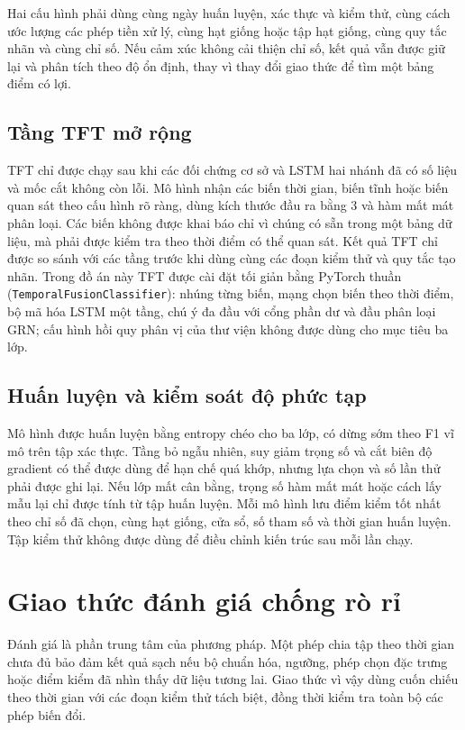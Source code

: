 Hai cấu hình phải dùng cùng ngày huấn luyện, xác thực và kiểm thử, cùng cách ước
lượng các phép tiền xử lý, cùng hạt giống hoặc tập hạt giống, cùng quy tắc nhãn và
cùng chỉ số. Nếu cảm xúc không cải thiện chỉ số, kết quả vẫn được giữ lại và phân
tích theo độ ổn định, thay vì thay đổi giao thức để tìm một bảng điểm có lợi.

\subsection{Tầng TFT mở rộng}

TFT chỉ được chạy sau khi các đối chứng cơ sở và LSTM hai nhánh đã có số liệu và mốc
cắt không còn lỗi. Mô hình nhận các biến thời gian, biến tĩnh hoặc biến quan sát theo
cấu hình rõ ràng, dùng kích thước đầu ra bằng 3 và hàm mất mát phân loại. Các biến
không được khai báo chỉ vì chúng có sẵn trong một bảng dữ liệu, mà phải được kiểm tra
theo thời điểm có thể quan sát. Kết quả TFT chỉ được so sánh với các tầng trước khi
dùng cùng các đoạn kiểm thử và quy tắc tạo nhãn. Trong đồ án này TFT được cài đặt
tối giản bằng PyTorch thuần (\texttt{TemporalFusionClassifier}): nhúng từng biến,
mạng chọn biến theo thời điểm, bộ mã hóa LSTM một tầng, chú ý đa đầu với cổng phần dư
và đầu phân loại GRN; cấu hình hồi quy phân vị của thư viện không được dùng cho mục
tiêu ba lớp.

\subsection{Huấn luyện và kiểm soát độ phức tạp}

Mô hình được huấn luyện bằng entropy chéo cho ba lớp, có dừng sớm theo F1 vĩ mô trên
tập xác thực. Tầng bỏ ngẫu nhiên, suy giảm trọng số và cắt biên độ gradient có thể
được dùng để hạn chế quá khớp, nhưng lựa chọn và số lần thử phải được ghi lại. Nếu
lớp mất cân bằng, trọng số hàm mất mát hoặc cách lấy mẫu lại chỉ được tính từ tập
huấn luyện. Mỗi mô hình lưu điểm kiểm tốt nhất theo chỉ số đã chọn, cùng hạt giống,
cửa sổ, số tham số và thời gian huấn luyện. Tập kiểm thử không được dùng để điều
chỉnh kiến trúc sau mỗi lần chạy.

\section{Giao thức đánh giá chống rò rỉ}
\label{sec:pp-danh-gia}

Đánh giá là phần trung tâm của phương pháp. Một phép chia tập theo thời gian chưa đủ
bảo đảm kết quả sạch nếu bộ chuẩn hóa, ngưỡng, phép chọn đặc trưng hoặc điểm kiểm đã
nhìn thấy dữ liệu tương lai. Giao thức vì vậy dùng cuốn chiếu theo thời gian với các
đoạn kiểm thử tách biệt, đồng thời kiểm tra toàn bộ các phép biến đổi.

